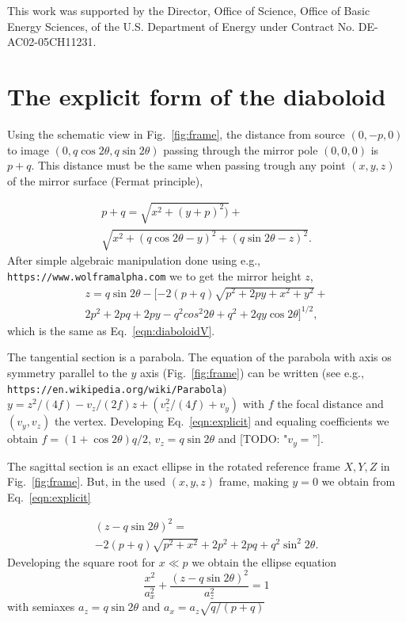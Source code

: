 \documentclass{iucr}              %
\newcommand{\todo}[1]{{\color{red}[TODO: "#1'']}}
\begin{document}
 
This work was supported by the Director, Office of Science, Office of Basic Energy Sciences, of the U.S. Department of Energy under Contract No. DE-AC02-05CH11231.

\appendix

\section{The explicit form of the diaboloid }
\label{appendix:diaboloid}

Using the schematic view in Fig.~\ref{fig:frame}, the distance from source $(0,-p,0)$ to image $(0,q \cos2\theta, q \sin2\theta)$ passing through the mirror pole $(0,0,0)$ is $p+q$. This distance must be the same when passing trough any point $(x,y,z)$ of the mirror surface (Fermat principle),

\begin{multline}
\label{eqn:distances}
p + q = 
\sqrt{x^2 + (y + p)^2)} + \\
\sqrt{x^2 + (q \cos2 \theta - y)^2 + (q \sin2 \theta - z)^2}.
\end{multline}
After simple algebraic manipulation done using e.g., {\tt https://www.wolframalpha.com} we to get the mirror height $z$,
\begin{multline}
\label{eqn:explicit}
z = q \sin2\theta - 
[-2 (p + q) \sqrt{p^2 + 2 p y + x^2 + y^2} + \\ 
2 p^2 +2  p q +  2 p y - q^2 cos^2 2 \theta +  q^2 + 2 q y \cos2\theta ]^{1/2},
\end{multline}
which is the same as Eq.~\ref{eqn:diaboloidV}. 

The tangential section is a parabola. The equation of the parabola with axis os symmetry parallel to the $y$ axis (Fig.~\ref{fig:frame}) can be written (see e.g., {\tt https://en.wikipedia.org/wiki/Parabola}) $y = z^2/(4 f) - v_z/(2 f) z + (v_z^2/(4 f)+ v_y)$ with $f$ the focal distance and $(v_y,v_z)$ the vertex. Developing Eq.~\ref{eqn:explicit} and equaling coefficients we obtain $f=(1+\cos2\theta)q/2$, $v_z=q \sin2\theta$ and \todo{$v_y=$}.

The sagittal section is an exact ellipse in the rotated reference frame $X,Y,Z$ in Fig.~\ref{fig:frame}. But, in the used $(x,y,z)$ frame, making $y=0$ we obtain from Eq.~\ref{eqn:explicit}

\begin{multline}
\label{eqn:explicit}
(z - q \sin2\theta)^2 = \\
-2 (p + q) \sqrt{p^2 + x^2}+ 
2 p^2 +2  p q + q^2 \sin^2 2 \theta.
\end{multline}
Developing the square root for $x\ll p$ we obtain the ellipse equation
\begin{equation}
\label{eqn:ellipse}
\frac{x^2}{a_x^2} + \frac{(z-q \sin2\theta)^2}{a_z^2}=1
\end{equation}
with semiaxes $a_z=q \sin2\theta$ and $a_x=a_z\sqrt{q/(p+q)}$
\end{document}

